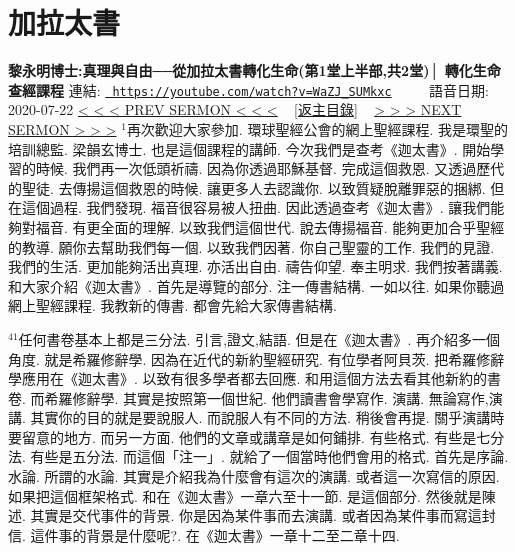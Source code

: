 \documentclass{book}
\begin{document}
\section{加拉太書}
\label{sec:WaZJ_SUMkxc}
\textbf{黎永明博士:真理與自由──從加拉太書轉化生命(第1堂上半部,共2堂)│ 轉化生命查經課程}
\newline
\newline
連結: \href{https://youtube.com/watch?v=WaZJ_SUMkxc}{\texttt{ https://youtube.com/watch?v=WaZJ\_SUMkxc}} ~~~~ 語音日期: 2020-07-22 
\newline
\newline
\hyperref[sec:mplCyadijHg]{\small{< < < PREV SERMON < < <}}
~
\hyperref[sec:index]{\small{[返主目錄]}}
~
\hyperref[sec:cDT6pcxcIlQ]{\small{> > > NEXT SERMON > > >}}
\newline
\newline
$^{1}$再次歡迎大家參加.
環球聖經公會的網上聖經課程.
我是環聖的培訓總監.
梁韻玄博士.
也是這個課程的講師.
今次我們是查考《迦太書》.
開始學習的時候.
我們再一次低頭祈禱.
因為你透過耶穌基督.
完成這個救恩.
又透過歷代的聖徒.
去傳揚這個救恩的時候.
讓更多人去認識你.
以致質疑脫離罪惡的捆綁.
但在這個過程.
我們發現.
福音很容易被人扭曲.
因此透過查考《迦太書》.
讓我們能夠對福音.
有更全面的理解.
以致我們這個世代.
說去傳揚福音.
能夠更加合乎聖經的教導.
願你去幫助我們每一個.
以致我們因著.
你自己聖靈的工作.
我們的見證.
我們的生活.
更加能夠活出真理.
亦活出自由.
禱告仰望.
奉主明求.
我們按著講義.
和大家介紹《迦太書》.
首先是導覽的部分.
注一傳書結構.
一如以往.
如果你聽過網上聖經課程.
我教新的傳書.
都會先給大家傳書結構.

$^{41}$任何書卷基本上都是三分法.
引言,證文,結語.
但是在《迦太書》.
再介紹多一個角度.
就是希羅修辭學.
因為在近代的新約聖經研究.
有位學者阿貝茨.
把希羅修辭學應用在《迦太書》.
以致有很多學者都去回應.
和用這個方法去看其他新約的書卷.
而希羅修辭學.
其實是按照第一個世紀.
他們讀書會學寫作.
演講.
無論寫作,演講.
其實你的目的就是要說服人.
而說服人有不同的方法.
稍後會再提.
關乎演講時要留意的地方.
而另一方面.
他們的文章或講章是如何鋪排.
有些格式.
有些是七分法.
有些是五分法.
而這個「注一」.
就給了一個當時他們會用的格式.
首先是序論.
水論.
所謂的水論.
其實是介紹我為什麼會有這次的演講.
或者這一次寫信的原因.
如果把這個框架格式.
和在《迦太書》一章六至十一節.
是這個部分.
然後就是陳述.
其實是交代事件的背景.
你是因為某件事而去演講.
或者因為某件事而寫這封信.
這件事的背景是什麼呢?.
在《迦太書》一章十二至二章十四.
\end{document}
